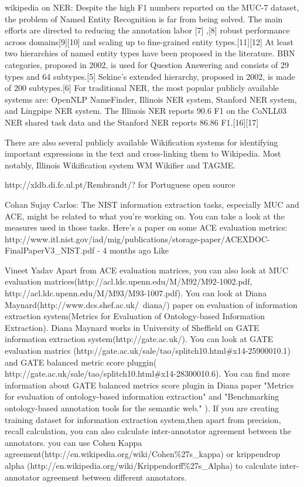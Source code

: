 {{wikipedia on NER: Despite the high F1 numbers reported on the MUC-7 dataset, the problem of Named Entity Recognition is far from being solved. The main efforts are directed to reducing the annotation labor [7] ,[8] robust performance across domains[9][10] and scaling up to fine-grained entity types.[11][12]
At least two hierarchies of named entity types have been proposed in the literature. BBN categories, proposed in 2002, is used for Question Answering and consists of 29 types and 64 subtypes.[5] Sekine's extended hierarchy, proposed in 2002, is made of 200 subtypes.[6]
For traditional NER, the most popular publicly available systems are: OpenNLP NameFinder, Illinois NER system, Stanford NER system, and Lingpipe NER system. The Illinois NER reports 90.6 F1 on the CoNLL03 NER shared task data and the Stanford NER reports 86.86 F1.[16][17]

There are also several publicly available Wikification systems for identifying important expressions in the text and cross-linking them to Wikipedia. Most notably, Illinois Wikification system WM Wikifier and TAGME.

http://xldb.di.fc.ul.pt/Rembrandt/? for Portuguese open source



Cohan Sujay Carlos: The NIST information extraction tasks, especially
MUC and ACE, might be related to what you're working on. You can take
a look at the measures used in those tasks. Here's a paper on some ACE
evaluation metrics:
http://www.itl.nist.gov/iad/mig/publications/storage-paper/ACEXDOC-FinalPaperV3_NIST.pdf -
4 months ago Like


Vineet Yadav Apart from ACE evaluation matrices, you can also look at
MUC evaluation matrices(http://acl.ldc.upenn.edu/M/M92/M92-1002.pdf,
http://acl.ldc.upenn.edu/M/M93/M93-1007.pdf). You can look at Diana
Maynard(http://www.dcs.shef.ac.uk/~diana/) paper on evaluation of
information extraction system(Metrics for Evaluation of Ontology-based
Information Extraction). Diana Maynard works in University of
Sheffield on GATE information extraction
system(http://gate.ac.uk/). You can look at GATE evaluation matrics
(http://gate.ac.uk/sale/tao/splitch10.html#x14-25900010.1) and GATE
balanced metric score pluggin(
http://gate.ac.uk/sale/tao/splitch10.html#x14-28300010.6). You can
find more information about GATE balanced metrics score plugin in
Diana paper "Metrics for evaluation of ontology-based information
extraction" and "Benchmarking ontology-based annotation tools for the
semantic web." ). If you are creating training dataset for information
extraction system,then apart from precision, recall calculation, you
can also calculate inter-annotator agreement between the
annotators. you can use Cohen Kappa
agreement(http://en.wikipedia.org/wiki/Cohen\%27s_kappa) or
krippendrop alpha
(http://en.wikipedia.org/wiki/Krippendorff\%27s_Alpha) to calculate
inter-annotator agreement between different annotators.




}}
